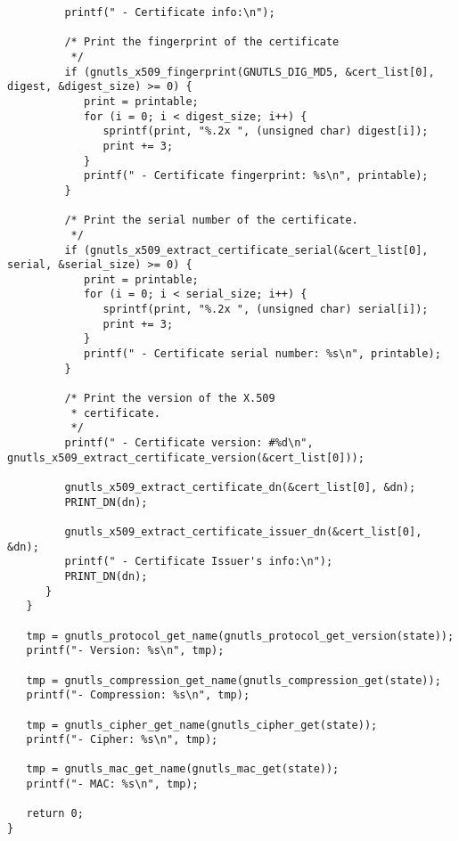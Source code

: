\begin{verbatim}
         printf(" - Certificate info:\n");

         /* Print the fingerprint of the certificate
          */
         if (gnutls_x509_fingerprint(GNUTLS_DIG_MD5, &cert_list[0], digest, &digest_size) >= 0) {
            print = printable;
            for (i = 0; i < digest_size; i++) {
               sprintf(print, "%.2x ", (unsigned char) digest[i]);
               print += 3;
            }
            printf(" - Certificate fingerprint: %s\n", printable);
         }

         /* Print the serial number of the certificate.
          */
         if (gnutls_x509_extract_certificate_serial(&cert_list[0], serial, &serial_size) >= 0) {
            print = printable;
            for (i = 0; i < serial_size; i++) {
               sprintf(print, "%.2x ", (unsigned char) serial[i]);
               print += 3;
            }
            printf(" - Certificate serial number: %s\n", printable);
         }

         /* Print the version of the X.509 
          * certificate.
          */
         printf(" - Certificate version: #%d\n", gnutls_x509_extract_certificate_version(&cert_list[0]));

         gnutls_x509_extract_certificate_dn(&cert_list[0], &dn);
         PRINT_DN(dn);

         gnutls_x509_extract_certificate_issuer_dn(&cert_list[0], &dn);
         printf(" - Certificate Issuer's info:\n");
         PRINT_DN(dn);
      }
   }

   tmp = gnutls_protocol_get_name(gnutls_protocol_get_version(state));
   printf("- Version: %s\n", tmp);

   tmp = gnutls_compression_get_name(gnutls_compression_get(state));
   printf("- Compression: %s\n", tmp);

   tmp = gnutls_cipher_get_name(gnutls_cipher_get(state));
   printf("- Cipher: %s\n", tmp);

   tmp = gnutls_mac_get_name(gnutls_mac_get(state));
   printf("- MAC: %s\n", tmp);

   return 0;
}

\end{verbatim}
